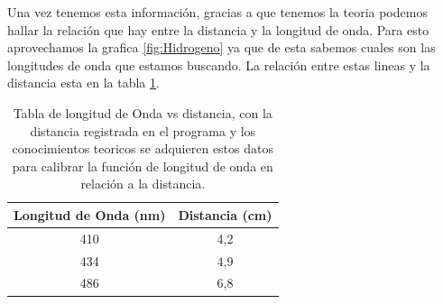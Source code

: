 \documentclass[a4paper, amsfonts, amssymb, amsmath, reprint, showkeys, nofootinbib, twoside]{revtex4-1}
\begin{document}
Una vez tenemos esta información, gracias a que tenemos la teoria podemos hallar la relación que hay entre la distancia y la longitud de onda. Para esto aprovechamos la grafica \ref{fig:Hidrogeno} ya que de esta sabemos cuales son las longitudes de onda que estamos buscando. La relación entre estas lineas y la distancia esta en la tabla \ref{table:calibrar}.
\begin{table}[h]
    \centering
    \caption{Tabla de longitud de Onda vs distancia, con la distancia registrada en el programa y los conocimientos teoricos se adquieren estos datos para calibrar la función de longitud de onda en relación a la distancia.}
    \label{table:calibrar}
    \begin{tabular}{|c|c|}
        \hline
        \hline
        Longitud de Onda (nm) & Distancia (cm)\\
        \hline
        410 & 4,2\\
        434 & 4,9\\
        486 & 6,8\\
        \hline
        \hline
    \end{tabular}
\end{table}
\end{document}

